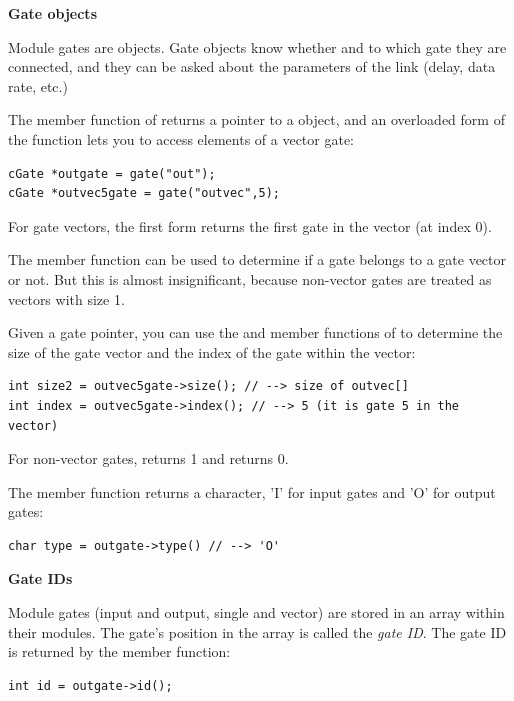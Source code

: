 \textbf{Gate objects}


Module gates are  objects. Gate objects
know whether and to which gate they are connected, and they can be
asked about the parameters of the link (delay, data rate, etc.)

The  member function of  returns a
pointer to a  object, and an overloaded form of the
function lets you to access elements of a vector gate:

\begin{Verbatim}
cGate *outgate = gate("out");
cGate *outvec5gate = gate("outvec",5);
\end{Verbatim}


For gate vectors, the first form returns the first gate in the 
vector (at index 0). 


The  member function can be used to determine if a 
gate belongs to a gate vector or not. But this is almost insignificant, 
because non-vector gates are treated as vectors with size 1.


Given a gate pointer, you can use the  and
 member functions of  to determine the
size of the gate vector and the
index of the gate within the vector:

\begin{Verbatim}
int size2 = outvec5gate->size(); // --> size of outvec[] 
int index = outvec5gate->index(); // --> 5 (it is gate 5 in the vector) 
\end{Verbatim}


For non-vector gates,  returns 1 and  returns 0.

The  member function returns a character, 'I' for input 
gates and 'O' for output gates:

\begin{Verbatim}
char type = outgate->type() // --> 'O'
\end{Verbatim}

\textbf{Gate IDs}


Module gates (input and output, single and vector) are stored in an
array within their modules. The gate's position in the array is called
the \textit{gate ID}. The gate ID is returned by the 
member function:


\begin{Verbatim}
int id = outgate->id();
\end{Verbatim}

